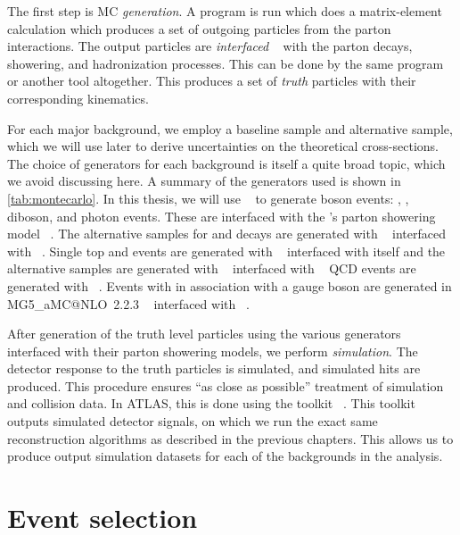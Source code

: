 The first step is MC \textit{generation}.
A program is run which does a matrix-element calculation which produces a set of outgoing particles from the parton interactions.
The output particles are \textit{interfaced} ~\cite{Mangano:2006rw} with the parton decays, showering, and hadronization processes.
This can be done by the same program or another tool altogether.
This produces a set of \textit{truth} particles with their corresponding kinematics.


For each major background, we employ a baseline sample and alternative sample, which we will use later to derive uncertainties on the theoretical cross-sections.
The choice of generators for each background is itself a quite broad topic, which we avoid discussing here.
A summary of the generators used is shown in \cref{tab:montecarlo}.
In this thesis, we will use \sherpa~\cite{Gleisberg:2008ta} to generate boson events: \Zll, \Wln, diboson, and photon events.
These are interfaced with the \sherpa's parton showering model ~\cite{sherpashower}.
The alternative samples for \Zll and \Wln decays are generated with \madgraph ~\cite{madgraph1} interfaced with \PYTHIAEight ~\cite{Sjostrand:2014zea}.
Single top and \ttbar events are generated with \powhegbox ~\cite{powheg-box} interfaced with itself and the alternative samples are generated with \mcatnlo ~\cite{Alwall:2014hca} interfaced with \HERWIGPP ~\cite{Frixione:2010ra}
QCD events are generated with \PYTHIAEight ~\cite{Sjostrand:2014zea}.
Events with \ttbar in association with a gauge boson are generated in MG5\_aMC@NLO~2.2.3 ~\cite{Alwall:2014hca} interfaced with \PYTHIAEight ~\cite{Sjostrand:2014zea}.

After generation of the truth level particles using the various generators interfaced with their parton showering models, we perform \textit{simulation}.
The detector response to the truth particles is simulated, and simulated hits are produced.
This procedure ensures ``as close as possible'' treatment of simulation and collision data.
In ATLAS, this is done using the \GEANTFour toolkit ~\cite{Agostinelli:2002hh}.
This toolkit outputs simulated detector signals, on which we run the exact same reconstruction algorithms as described in the previous chapters.
This allows us to produce output simulation datasets for each of the backgrounds in the analysis.

\section{Event selection}

